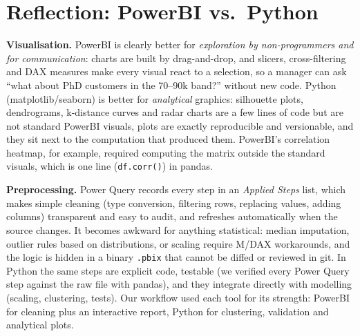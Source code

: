 \documentclass[11pt]{article}
\begin{document}
\section{Reflection: PowerBI vs.\ Python}
\textbf{Visualisation.} PowerBI is clearly better for \emph{exploration by non-programmers and for
communication}: charts are built by drag-and-drop, and slicers, cross-filtering and DAX measures make
every visual react to a selection, so a manager can ask ``what about PhD customers in the 70--90k band?''
without new code. Python (matplotlib/seaborn) is better for \emph{analytical} graphics: silhouette
plots, dendrograms, k-distance curves and radar charts are a few lines of code but are not standard
PowerBI visuals, plots are exactly reproducible and versionable, and they sit next to the computation
that produced them. PowerBI's correlation heatmap, for example, required computing the matrix
outside the standard visuals, which is one line (\texttt{df.corr()}) in pandas.

\textbf{Preprocessing.} Power Query records every step in an \emph{Applied Steps} list, which makes
simple cleaning (type conversion, filtering rows, replacing values, adding columns) transparent and
easy to audit, and refreshes automatically when the source changes. It becomes awkward for anything
statistical: median imputation, outlier rules based on distributions, or scaling require M/DAX
workarounds, and the logic is hidden in a binary \texttt{.pbix} that cannot be diffed or reviewed in
git. In Python the same steps are explicit code, testable (we verified every Power Query step against
the raw file with pandas), and they integrate directly with modelling (scaling, clustering, tests).
Our workflow used each tool for its strength: PowerBI for cleaning plus an interactive report,
Python for clustering, validation and analytical plots.

\end{document}
